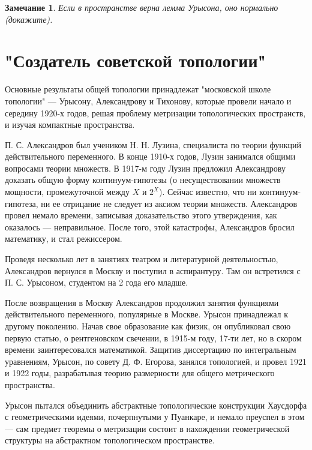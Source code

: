 \documentclass[12pt]{book}
\theoremstyle{upshape}
\newtheorem{zadacha}{Задача}[chapter]
\theoremstyle{generic}
\newtheorem{remark}[teorema]{Замечание}
\def\замечание{\begin{remark}}
\def\еза{\end{remark}}
\theoremstyle{upshapenonumber}
\newcommand{\следствие}{%
     \refstepcounter{teorema}
     {\noindent\bf Следствие \thechapter.\arabic{teorema}:\ }}
\newcommand{\пример}{%
     \refstepcounter{teorema}
     {\noindent\bf Пример \thechapter.\arabic{teorema}:\ }}
\newcommand{\лемма}{%
     \refstepcounter{teorema}
     {\noindent\bf Лемма \thechapter.\arabic{teorema}:\ }}
\newcommand{\теорема}{%
     \refstepcounter{teorema}
     {\noindent\bf Теорема \thechapter.\arabic{teorema}:\ }}
\newcommand{\утверждение}{%
     \refstepcounter{teorema}
     {\noindent\bf Утверждение \thechapter.\arabic{teorema}:\ }}
\def\ем{\em}
\def\задача{\begin{zadacha}}
\def\ез{\end{zadacha}}
\def\еу{\end{ukazanie}}
\def\ео{\end{opredelenie}}
\def\енум{\begin{enumerate}}
\def\ее{\end{enumerate}}
\begin{document}
\замечание
Если в пространстве верна лемма Урысона, оно нормально
(докажите).
\еза


\section{"Создатель советской топологии"}


Основные результаты общей топологии принадлежат
"московской школе топологии" --- Урысону, Александрову и 
Тихонову, которые провели начало и середину 1920-х годов,
решая проблему метризации топологических пространств,
и изучая компактные пространства.

П. С. Александров был учеником Н. Н. Лузина,
специалиста по теории функций действительного
переменного. В конце 1910-х годов, Лузин занимался
общими вопросами теории множеств. 
В 1917-м году Лузин предложил Александрову
доказать общую форму кон\-ти\-ну\-ум-\-ги\-по\-тезы
(о несуществовании множеств мощности, промежуточной 
между $X$ и $2^X$). Сейчас известно, что
ни континуум-гипотеза, ни ее отрицание 
не следует из аксиом теории множеств.
Александров провел немало времени,
записывая доказательство этого утверждения,
как оказалось --- неправильное. После того,
этой катастрофы, Александров бросил
математику, и стал режиссером.

Проведя несколько лет в занятиях театром
и литературной деятельностью, Александров вернулся
в Москву и поступил в аспирантуру. Там он встретился
с П. С. Урысоном, студентом на 2 года его младше.

После возвращения в Москву Александров продолжил занятия
функциями действительного переменного, популярные
в Москве. Урысон принадлежал к другому поколению.
Начав свое образование как физик, он опубликовал
свою первую статью, о рентгеновском свечении,
 в 1915-м году, 17-ти лет, но в скором времени
заинтересовался математикой. Защитив диссертацию
по интегральным уравнениям, Урысон, по совету
Д. Ф. Егорова, занялся топологией, и провел
1921 и 1922 годы, разрабатывая теорию размерности
для общего метрического пространства. 

Урысон пытался объединить абстрактные топологические
конструкции Хаусдорфа с геометрическими идеями,
почерпнутыми у Пуанкаре, и немало преуспел в этом --- 
сам предмет теоремы о метризации состоит в нахождении
геометрической структуры на абстрактном топологическом
пространстве.
\end{document}
